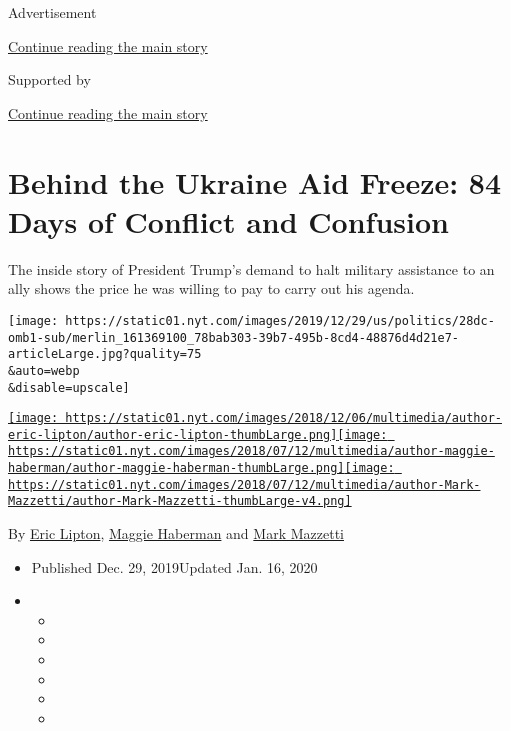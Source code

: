 Advertisement

\protect\hyperlink{after-top}{Continue reading the main story}

Supported by

\protect\hyperlink{after-sponsor}{Continue reading the main story}

\hypertarget{behind-the-ukraine-aid-freeze-84-days-of-conflict-and-confusion}{%
\section{Behind the Ukraine Aid Freeze: 84 Days of Conflict and
Confusion}\label{behind-the-ukraine-aid-freeze-84-days-of-conflict-and-confusion}}

The inside story of President Trump's demand to halt military assistance
to an ally shows the price he was willing to pay to carry out his
agenda.

\texttt{[image: https://static01.nyt.com/images/2019/12/29/us/politics/28dc-omb1-sub/merlin\_161369100\_78bab303-39b7-495b-8cd4-48876d4d21e7-articleLarge.jpg?quality=75\\\&auto=webp\\\&disable=upscale]}

\href{https://www.nytimes.com/by/eric-lipton}{\texttt{[image: https://static01.nyt.com/images/2018/12/06/multimedia/author-eric-lipton/author-eric-lipton-thumbLarge.png]}}\href{https://www.nytimes.com/by/maggie-haberman}{\texttt{[image: https://static01.nyt.com/images/2018/07/12/multimedia/author-maggie-haberman/author-maggie-haberman-thumbLarge.png]}}\href{https://www.nytimes.com/by/mark-mazzetti}{\texttt{[image: https://static01.nyt.com/images/2018/07/12/multimedia/author-Mark-Mazzetti/author-Mark-Mazzetti-thumbLarge-v4.png]}}

By \href{https://www.nytimes.com/by/eric-lipton}{Eric Lipton},
\href{https://www.nytimes.com/by/maggie-haberman}{Maggie Haberman} and
\href{https://www.nytimes.com/by/mark-mazzetti}{Mark Mazzetti}

\begin{itemize}
\item
  Published Dec. 29, 2019Updated Jan. 16, 2020
\item
  \begin{itemize}
  \item
  \item
  \item
  \item
  \item
  \item
  \end{itemize}
\end{itemize}

